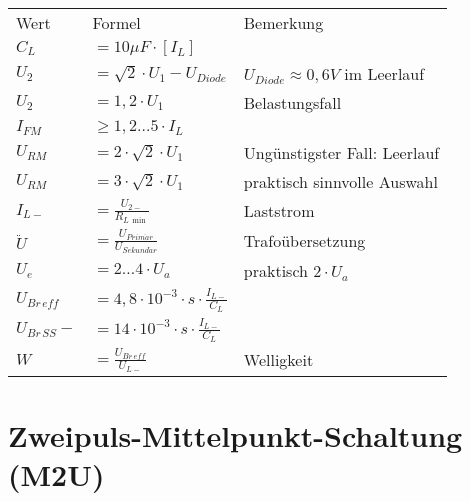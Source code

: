     \begin{table}[H]
        \begin{tabularx}{\columnwidth}{l l l}
            Wert            & Formel                                            & Bemerkung \\
            $C_L$           & $=10\mu F\cdot [I_L]$                             & \\
            $U_2$           & $= \sqrt{2}\cdot U_1-U_{Diode}$                   & $U_{Diode}\approx 0,6V$ im Leerlauf \\
            $U_2$           & $= 1,2\cdot U_1$                                  & Belastungsfall \\
            $I_{FM}$        & $\geq1,2\dots 5\cdot I_L$                         & \\
            $U_{RM}$        & $=2\cdot \sqrt{2}\cdot U_1$                       & Ungünstigster Fall: Leerlauf \\
            $U_{RM}$        & $=3\cdot \sqrt{2}\cdot U_1$                       & praktisch sinnvolle Auswahl \\
            $I_{L-}$        & $=\frac{U_{2-}}{R_{L\,\min}}$                     & Laststrom \\
            $\ddot{U}$      & $=\frac{U_{Prim\ddot{a}r}}{U_{Sekund\ddot{a}r}}$  & Trafoübersetzung \\
            $U_e$           & $=2\dots 4\cdot U_a$                              & praktisch $2\cdot U_a$ \\
            $U_{Br\,eff}$   & $=4,8\cdot 10^{-3}\cdot s\cdot\frac{I_{L-}}{C_L}$ & \\
            $U_{Br\,SS}-$   & $=14\cdot 10^{-3}\cdot s\cdot\frac{I_{L-}}{C_L}$  & \\
            $W$             & $=\frac{U_{Br\,eff}}{U_{L-}}$                     & Welligkeit \\ %
        \end{tabularx}
    \end{table}
\section{Zweipuls-Mittelpunkt-Schaltung (M2U)}\label{sec:zweipuls-mittelpunkt-schaltung} %

